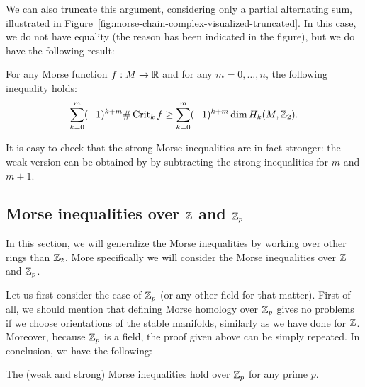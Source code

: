     We can also truncate this argument, considering only a partial alternating sum, illustrated in Figure~\ref{fig:morse-chain-complex-visualized-truncated}.
    In this case, we do not have equality (the reason has been indicated in the figure), but we do have the following result:
\begin{theorem}
    For any Morse function $f: M \to  \mathbb{R}$ and for any $m = 0, \ldots, n$, the following inequality holds:
    \[
        \sum_{k=0}^{m} (-1)^{k+m} \# \operatorname{Crit}_k f \ge  \sum_{k=0}^{m} (-1)^{k+m} \dim H_k(M, \mathbb{Z}_2)
    .\]
\end{theorem}

It is easy to check that the strong Morse inequalities are in fact stronger: the weak version can be obtained by by subtracting the strong inequalities for $m$ and  $m+1$.

\subsection{Morse inequalities over $\mathbb{Z}$ and $\mathbb{Z}_p$}

In this section, we will generalize the Morse inequalities by working over other rings than $\mathbb{Z}_2$. More specifically we will consider the Morse inequalities over $\mathbb{Z}$ and $\mathbb{Z}_p$.


Let us first consider the case of $\mathbb{Z}_p$ (or any other field for that matter).
First of all,
we should mention that defining Morse homology over $\mathbb{Z}_p$ gives no problems if we choose orientations of the stable manifolds, similarly as we have done for $\mathbb{Z}$. Moreover,
because $\mathbb{Z}_p$ is a field,
the proof given above can be simply repeated. In conclusion, we have the following:

\begin{theorem}
    The (weak and strong) Morse inequalities hold over $\mathbb{Z}_p$ for any prime $p$.
\end{theorem}

